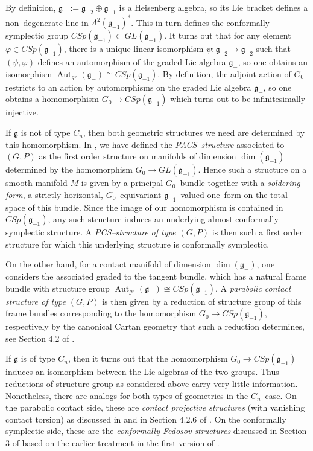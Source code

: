 \documentclass[12pt,a4paper]{amsart}
\def\frak{\mathfrak}
\let\phi\varphi
\newcommand{\ph}{\phi}
\newcommand{\ps}{\psi}
\newcommand{\La}{\Lambda}
\newcommand{\Aut}{\operatorname{Aut}}
\numberwithin{theorem}{section}
\theoremstyle{definition}
\theoremstyle{remark}
\begin{document}
By definition, $\frak g_{-}:=\frak g_{-2}\oplus\frak g_{-1}$ is a
Heisenberg algebra, so its Lie bracket defines a non--degenerate line
in $\La^2(\frak g_{-1})^*$. This in turn defines the conformally
symplectic group $CSp(\frak g_{-1})\subset GL(\frak g_{-1})$. It turns
out that for any element $\ph\in CSp(\frak g_{-1})$, there is a unique
linear isomorphism $\ps:\frak g_{-2}\to\frak g_{-2}$ such that
$(\ps,\ph)$ defines an automorphism of the graded Lie algebra $\frak
g_{-}$, so one obtains an isomorphism $\Aut_{gr}(\frak g_-)\cong
CSp(\frak g_{-1})$. By definition, the adjoint action of $G_0$
restricts to an action by automorphisms on the graded Lie algebra
$\frak g_-$, so one obtains a homomorphism $G_0\to CSp(\frak g_{-1})$
which turns out to be infinitesimally injective. 

If $\frak g$ is not of type $C_n$, then both geometric structures we
need are determined by this homomorphism. In \cite{PCS1}, we have
defined the \textit{PACS--structure} associated to $(G,P)$ as the
first order structure on manifolds of dimension $\dim(\frak g_{-1})$
determined by the homomorphism $G_0\to GL(\frak g_{-1})$. Hence such a
structure on a smooth manifold $M$ is given by a principal
$G_0$--bundle together with a \textit{soldering form}, a strictly
horizontal, $G_0$--equivariant $\frak g_{-1}$--valued one--form on the
total space of this bundle. Since the image of our homomorphism is
contained in $CSp(\frak g_{-1})$, any such structure induces an
underlying almost conformally symplectic structure. A
\textit{PCS--structure of type $(G,P)$} is then such a first order
structure for which this underlying structure is conformally
symplectic.

On the other hand, for a contact manifold of dimension $\dim(\frak
g_-)$, one considers the associated graded to the tangent bundle,
which has a natural frame bundle with structure group $\Aut_{gr}(\frak
g_-)\cong CSp(\frak g_{-1})$. A \textit{parabolic contact structure of
  type $(G,P)$} is then given by a reduction of structure group of
this frame bundles corresponding to the homomorphism $G_0\to CSp(\frak
g_{-1})$, respectively by the canonical Cartan geometry that such a
reduction determines, see Section 4.2 of \cite{book}.

If $\frak g$ is of type $C_n$, then it turns out that the homomorphism
$G_0\to CSp(\frak g_{-1})$ induces an isomorphism between the Lie
algebras of the two groups. Thus reductions of structure group as
considered above carry very little information. Nonetheless, there are
analogs for both types of geometries in the $C_n$--case. On the
parabolic contact side, these are \textit{contact projective
  structures} (with vanishing contact torsion) as discussed in
\cite{Fox} and in Section 4.2.6 of \cite{book}. On the conformally
symplectic side, these are the \textit{conformally Fedosov structures}
discussed in Section 3 of \cite{PCS2} based on the earlier treatment
in the first version of \cite{E-S}.
\end{document}

